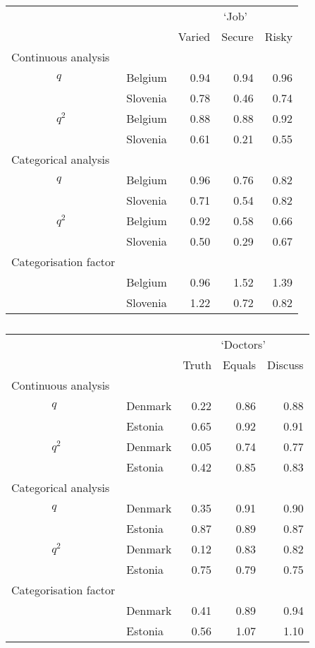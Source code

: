 \documentclass[a4paper,12pt]{article}
\begin{document}
\begin{table}\centering\caption{\label{tab:job}}\begin{tabular}{lllrrr}
\hline
  &    & & \multicolumn{3}{c}{`Job'} \\
 &      &   & Varied & Secure & Risky\\
\hline
\multicolumn{2}{l}{Continuous analysis    } &  &  &  & \\
 &   $q$ & Belgium & 0.94 & 0.94 & 0.96\\
 &    & Slovenia & 0.78 & 0.46 & 0.74\\
 &   $q^2$ & Belgium & 0.88 & 0.88 & 0.92\\
 &    & Slovenia & 0.61 & 0.21 & 0.55\\
\multicolumn{2}{l}{Categorical analysis  }   &  &  &  & \\
 &   $q$ & Belgium & 0.96 & 0.76 & 0.82\\
 &    & Slovenia & 0.71 & 0.54 & 0.82\\
 &   $q^2$ & Belgium & 0.92 & 0.58 & 0.66\\
 &    & Slovenia & 0.50 & 0.29 & 0.67\\
\multicolumn{2}{l}{Categorisation factor}     &  &  &  & \\
 &    & Belgium & 0.96 & 1.52 & 1.39\\
 &     & Slovenia & 1.22 & 0.72 & 0.82\\
\hline
\end{tabular}\end{table}

\begin{table}\centering\caption{\label{tab:doctors}}\begin{tabular}{lllrrr}

\hline
&&&\multicolumn{3}{c}{`Doctors'}\\
 &  &  & Truth & Equals & Discuss\\
\hline
\multicolumn{2}{l}{Continuous analysis   }&  &  &  & \\
 & $q$ & Denmark & 0.22 & 0.86 & 0.88\\
 &  & Estonia & 0.65 & 0.92 & 0.91\\
 & $q^2$ & Denmark & 0.05 & 0.74 & 0.77\\
 &  & Estonia & 0.42 & 0.85 & 0.83\\
\multicolumn{2}{l}{Categorical analysis  } &  &  &  & \\
 & $q$ & Denmark & 0.35 & 0.91 & 0.90\\
 &  & Estonia & 0.87 & 0.89 & 0.87\\
 & $q^2$ & Denmark & 0.12 & 0.83 & 0.82\\
 &  & Estonia & 0.75 & 0.79 & 0.75\\
\multicolumn{2}{l}{Categorisation factor}   &  &  &  & \\
 &  & Denmark & 0.41 & 0.89 & 0.94\\
 &  & Estonia & 0.56 & 1.07 & 1.10\\
\hline
\end{tabular}\end{table}
\end{document}
